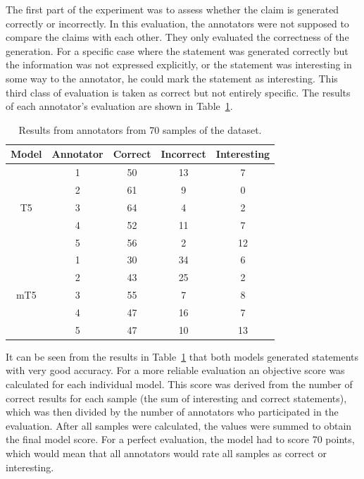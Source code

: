 The first part of the experiment was to assess whether the claim is generated correctly or incorrectly. In this evaluation, the annotators were not supposed to compare the claims with each other. They only evaluated the correctness of the generation. For a specific case where the statement was generated correctly but the information was not expressed explicitly, or the statement was interesting in some way to the annotator, he could mark the statement as interesting. This third class of evaluation is taken as correct but not entirely specific. The results of each annotator's evaluation are shown in Table~\ref{tab:anotators}.

\begin{table}[H]
    \centering
    \begin{tabular}{c|cccc}
         \hline
        Model & Annotator & Correct & Incorrect & Interesting \\
         \hline
        \multirow{5}{*}{T5} & 1 & 50 & 13 & 7 \\
         & 2 & 61 & 9 & 0 \\
         & 3 & 64 & 4 & 2 \\
         & 4 & 52 & 11 & 7 \\
         & 5 & 56 & 2 & 12 \\
         \hline
        \multirow{5}{*}{mT5} & 1 & 30 & 34 & 6 \\
         & 2 & 43 & 25 & 2 \\
         & 3 & 55 & 7 & 8 \\
         & 4 & 47 & 16 & 7 \\
         & 5 & 47 & 10 & 13 \\
         \hline
    \end{tabular}
    \caption{Results from annotators from 70 samples of the dataset.}
    \label{tab:anotators}
\end{table}

It can be seen from the results in Table~\ref{tab:anotators} that both models generated statements with very good accuracy. For a more reliable evaluation an objective score was calculated for each individual model. This score was derived from the number of correct results for each sample (the sum of interesting and correct statements), which was then divided by the number of annotators who participated in the evaluation. After all samples were calculated, the values were summed to obtain the final model score. For a perfect evaluation, the model had to score 70 points, which would mean that all annotators would rate all samples as correct or interesting.

